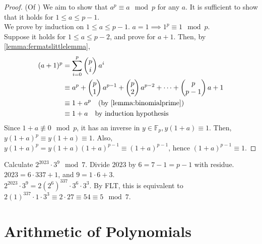 \documentclass[12pt,oneside]{article}
\begin{document}
\begin{proof}(Of )
  We aim to show that $a^p \equiv a \mod p$ for any $a$. It is sufficient to show that it holds for $1 \leq a \leq p - 1$.\\
  We prove by induction on $1 \leq a \leq p -1$. $a = 1 \implies 1^p \equiv 1 \mod p$.\\ Suppose it holds for $1 \leq a\leq p -2$, and prove for $a+1$. Then, by \cref{lemma:fermatslittlelemma}, \begin{align}
    (a+1)^{p} &= \sum_{i=0}^{p} \begin{pmatrix}
      p\\
      i
    \end{pmatrix}a^{i}\\
    &\equiv a^p + \begin{pmatrix}
      p\\1
    \end{pmatrix}a^{p-1} + \begin{pmatrix}
      p\\2
    \end{pmatrix}a^{p-2} + \cdots + \begin{pmatrix}
      p\\p-1
    \end{pmatrix}a + 1\\
    &\equiv 1 + a^p \quad \text{(by \cref{lemma:binomialprime})}\\
    &\equiv 1 + a\quad \text{by induction hypothesis}
  \end{align}
  Since $1 + a \not\equiv 0 \mod p$, it has an inverse in $y \in \mathbb{F}_p, y(1+a) \equiv 1$. Then, $y(1+a)^p\equiv y(1+a) \equiv 1$. Also, $y(1+a)^p = y(1+a)(1+a)^{p-1} \equiv (1+a)^{p-1}$, hence $(1+a)^{p-1} \equiv 1$.
\end{proof}


\begin{example}
  Calculate $2^{2023} \cdot 3^9 \mod 7$. Divide $2023$ by $6 = 7-1 = p - 1$ with residue. $2023 = 6 \cdot 337 + 1$, and $9 = 1 \cdot 6 + 3$.\\
  $2^{2023} \cdot 3^9 = 2(2^{6})^{337}\cdot 3^6 \cdot 3^3$. By FLT, this is equivalent to $2(1)^{337}\cdot 1 \cdot 3^3 \equiv 2 \cdot 27 \equiv 54 \equiv 5 \mod 7$.
\end{example}


\part{Arithmetic of Polynomials}
\end{document}
